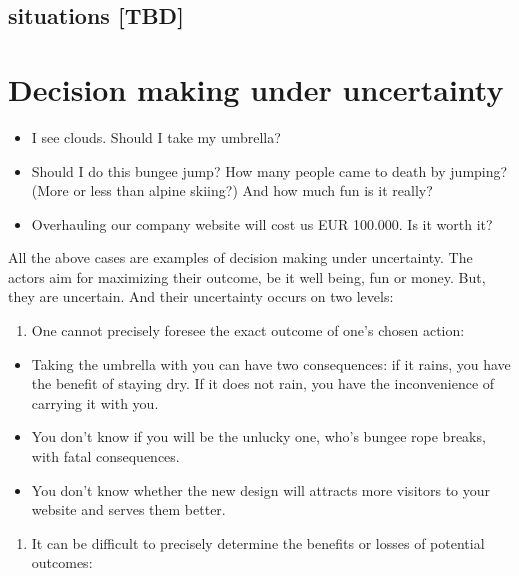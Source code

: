 \documentclass[]{svmono}
\providecommand{\tightlist}{%
  \setlength{\itemsep}{0pt}\setlength{\parskip}{0pt}}
\theoremstyle{definition}
\theoremstyle{definition}
\theoremstyle{definition}
\theoremstyle{remark}
\begin{document}
\subsection{situations {[}TBD{]}}\label{situations-tbd}

\section{Decision making under uncertainty}\label{decision_making}

\begin{itemize}
\tightlist
\item
  I see clouds. Should I take my umbrella?
\item
  Should I do this bungee jump? How many people came to death by
  jumping? (More or less than alpine skiing?) And how much fun is it
  really?
\item
  Overhauling our company website will cost us EUR 100.000. Is it worth
  it?
\end{itemize}

All the above cases are examples of decision making under uncertainty.
The actors aim for maximizing their outcome, be it well being, fun or
money. But, they are uncertain. And their uncertainty occurs on two
levels:

\begin{enumerate}
\def\labelenumi{\arabic{enumi}.}
\tightlist
\item
  One cannot precisely foresee the exact outcome of one's chosen action:
\end{enumerate}

\begin{itemize}
\tightlist
\item
  Taking the umbrella with you can have two consequences: if it rains,
  you have the benefit of staying dry. If it does not rain, you have the
  inconvenience of carrying it with you.
\item
  You don't know if you will be the unlucky one, who's bungee rope
  breaks, with fatal consequences.
\item
  You don't know whether the new design will attracts more visitors to
  your website and serves them better.
\end{itemize}

\begin{enumerate}
\def\labelenumi{\arabic{enumi}.}
\setcounter{enumi}{1}
\tightlist
\item
  It can be difficult to precisely determine the benefits or losses of
  potential outcomes:
\end{enumerate}
\end{document}

